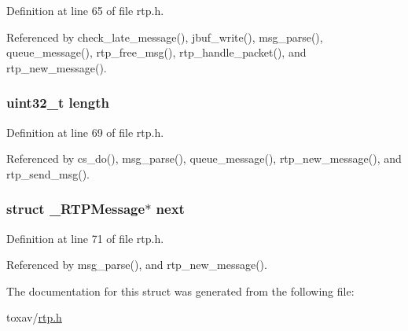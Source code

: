 Definition at line 65 of file rtp.\+h.



Referenced by check\+\_\+late\+\_\+message(), jbuf\+\_\+write(), msg\+\_\+parse(), queue\+\_\+message(), rtp\+\_\+free\+\_\+msg(), rtp\+\_\+handle\+\_\+packet(), and rtp\+\_\+new\+\_\+message().

\hypertarget{struct___r_t_p_message_aebb70c2aab3407a9f05334c47131a43b}{
\subsubsection[{length}]{\setlength{\rightskip}{0pt plus 5cm}uint32\+\_\+t length}}\label{struct___r_t_p_message_aebb70c2aab3407a9f05334c47131a43b}


Definition at line 69 of file rtp.\+h.



Referenced by cs\+\_\+do(), msg\+\_\+parse(), queue\+\_\+message(), rtp\+\_\+new\+\_\+message(), and rtp\+\_\+send\+\_\+msg().

\hypertarget{struct___r_t_p_message_af02d4bf6724c59e5df90bacdfc8a8499}{
\subsubsection[{next}]{\setlength{\rightskip}{0pt plus 5cm}struct {\bf \+\_\+\+R\+T\+P\+Message}$\ast$ next}}\label{struct___r_t_p_message_af02d4bf6724c59e5df90bacdfc8a8499}


Definition at line 71 of file rtp.\+h.



Referenced by msg\+\_\+parse(), and rtp\+\_\+new\+\_\+message().



The documentation for this struct was generated from the following file\+:\begin{DoxyCompactItemize}
\item 
toxav/\hyperlink{rtp_8h}{rtp.\+h}\end{DoxyCompactItemize}
